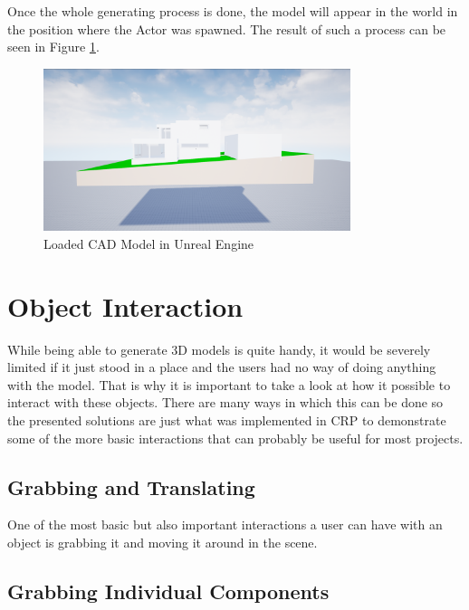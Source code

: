 Once the whole generating process is done, the model will appear in the world in the position where the Actor was spawned. The result of such a process can be seen in Figure \ref{fig:LoadedModel}.

\begin{figure}[htpb]
	\centering
	\includegraphics[width=0.8\textwidth]{fig/LoadedModel.png}
	\caption[Loaded CAD Model in Unreal Engine]{Loaded CAD Model in Unreal Engine\protect}
	\label{fig:LoadedModel}
\end{figure}




\section{Object Interaction}\label{chp:ObjectInteraction}
While being able to generate 3D models is quite handy, it would be severely limited if it just stood in a place and the users had no way of doing anything with the model. That is why it is important to take a look at how it possible to interact with these objects. There are many ways in which this can be done so the presented solutions are just what was implemented in CRP to demonstrate some of the more basic interactions that can probably be useful for most projects. 


\subsection{Grabbing and Translating}

One of the most basic but also important interactions a user can have with an object is grabbing it and moving it around in the scene.

\subsection{Grabbing Individual Components}

